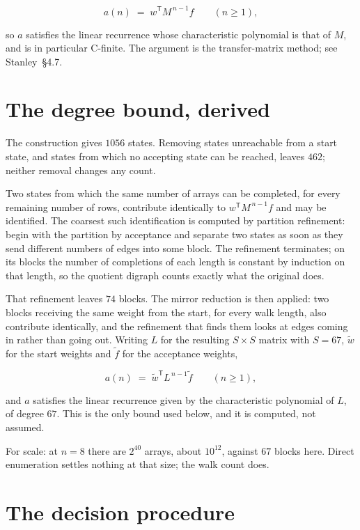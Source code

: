 \documentclass[11pt]{article}
\theoremstyle{definition}
\begin{document}
\[a(n) \;=\; w^{\mathsf T} M^{\,n-1} f \qquad (n \ge 1),\]

so $a$ satisfies the linear recurrence whose characteristic polynomial is that of $M$, and is in particular C-finite. The argument is the transfer-matrix method; see Stanley~\S4.7.

\section{The degree bound, derived}

The construction gives $1056$ states. Removing states unreachable from a start state, and states from which no accepting state can be reached, leaves $462$; neither removal changes any count.

Two states from which the same number of arrays can be completed, for every remaining number of rows, contribute identically to $w^{\mathsf T}M^{\,n-1}f$ and may be identified. The coarsest such identification is computed by partition refinement: begin with the partition by acceptance and separate two states as soon as they send different numbers of edges into some block. The refinement terminates; on its blocks the number of completions of each length is constant by induction on that length, so the quotient digraph counts exactly what the original does.

That refinement leaves $74$ blocks. The mirror reduction is then applied: two blocks receiving the same weight from the start, for every walk length, also contribute identically, and the refinement that finds them looks at edges coming in rather than going out. Writing $L$ for the resulting $S \times S$ matrix with $S = 67$, $\tilde w$ for the start weights and $\tilde f$ for the acceptance weights,

\[a(n) \;=\; \tilde w^{\mathsf T} L^{\,n-1} \tilde f \qquad (n \ge 1),\]

and $a$ satisfies the linear recurrence given by the characteristic polynomial of $L$, of degree $67$. This is the only bound used below, and it is computed, not assumed.

For scale: at $n = 8$ there are $2^{40}$ arrays, about $10^{12}$, against $67$ blocks here. Direct enumeration settles nothing at that size; the walk count does.

\section{The decision procedure}
\end{document}
